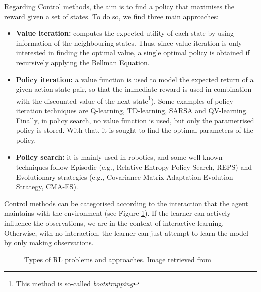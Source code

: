 \documentclass[12pt, a4paper,twoside]{tesi_upf}
\begin{document}
			Regarding Control methods, the aim is to find a policy that maximises the reward given a set of states. To do so, we find three main approaches: 
			\begin{itemize}
				\item \textbf{Value iteration:} computes the expected utility of each state by using information of the neighbouring states. Thus, since value iteration is only interested in finding the optimal value, a single optimal policy is obtained if recursively applying the Bellman Equation.
				\item \textbf{Policy iteration:} a value function is used to model the expected return of a given action-state pair, so that the immediate reward is used in combination with the discounted value of the next state\footnote{This method is so-called \textit{bootstrapping}}). Some examples of policy iteration techniques are Q-learning, TD-learning, SARSA and QV-learning. Finally, in policy search, no value function is used, but only the parametrised policy is stored. With that, it is sought to find the optimal parameters of the policy.
				\item \textbf{Policy search:} it is mainly used in robotics, and some well-known techniques follow Episodic (e.g., Relative Entropy Policy Search, REPS) and Evolutionary strategies (e.g., Covariance Matrix Adaptation Evolution Strategy, CMA-ES).
			\end{itemize}   
			Control methods can be categorised according to the interaction that the agent maintains with the environment (see Figure \ref{fig:rl_control_types}). If the learner can actively influence the observations, we are in the context of interactive learning. Otherwise, with no interaction, the learner can just attempt to learn the model by only making observations.			
			\begin{figure}[h!]
				\centering
				\caption{Types of RL problems and approaches. Image retrieved from \cite{szepesvari2010algorithms}}
				\label{fig:rl_control_types}
			\end{figure}
			
\end{document}
